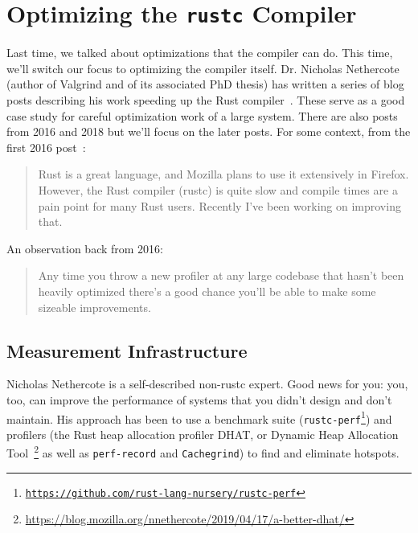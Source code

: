 




\section*{Optimizing the \texttt{rustc} Compiler}

Last time, we talked about optimizations that the compiler can do.
This time, we'll switch our focus to optimizing the compiler itself.
Dr. Nicholas Nethercote (author of Valgrind and of its associated PhD thesis)
has written a series of blog posts describing his
work speeding up the Rust
compiler~\cite{nethercote20:_how_rust,nethercote19:_how_rust,nethercote19:_rust,nethercote19b:_how_rust}. These
serve as a good case study for careful optimization work of a large
system. There are also posts from 2016 and 2018 but we'll focus on the later posts.
For some context, from the first 2016 post~\cite{nethercote16:_how_rust}:
\begin{quote}
Rust is a great language, and Mozilla plans to use it extensively in Firefox. However, the Rust compiler (rustc) is quite slow and compile times are a pain point for many Rust users. Recently I’ve been working on improving that.
\end{quote}

An observation back from 2016:
\begin{quote}
Any time you throw a new profiler at any large codebase that hasn’t been heavily optimized there’s a good chance you’ll be able to make some sizeable improvements.
\end{quote}

\subsection*{Measurement Infrastructure}

Nicholas Nethercote is a self-described non-rustc expert. Good news for you: you, too, can improve the
performance of systems that you didn't design and don't maintain. His approach has been to use a benchmark suite (\texttt{rustc-perf\footnote{\url{https://github.com/rust-lang-nursery/rustc-perf}}})
and profilers (the Rust heap allocation profiler DHAT, or Dynamic Heap Allocation Tool~\footnote{\url{https://blog.mozilla.org/nnethercote/2019/04/17/a-better-dhat/}} as well as
\texttt{perf-record} and \texttt{Cachegrind}) to find and eliminate hotspots.

